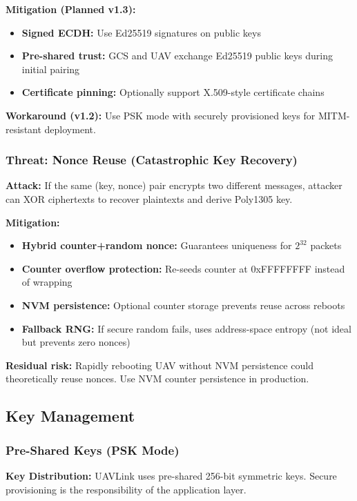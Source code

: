 \documentclass[11pt,a4paper]{article}
\begin{document}
\textbf{Mitigation (Planned v1.3):}
\begin{itemize}[noitemsep]
    \item \textbf{Signed ECDH:} Use Ed25519 signatures on public keys
    \item \textbf{Pre-shared trust:} GCS and UAV exchange Ed25519 public keys during initial pairing
    \item \textbf{Certificate pinning:} Optionally support X.509-style certificate chains
\end{itemize}

\textbf{Workaround (v1.2):} Use PSK mode with securely provisioned keys for MITM-resistant deployment.

\subsubsection{Threat: Nonce Reuse (Catastrophic Key Recovery)}

\textbf{Attack:} If the same (key, nonce) pair encrypts two different messages, attacker can XOR ciphertexts to recover plaintexts and derive Poly1305 key.

\textbf{Mitigation:}
\begin{itemize}[noitemsep]
    \item \textbf{Hybrid counter+random nonce:} Guarantees uniqueness for $2^{32}$ packets
    \item \textbf{Counter overflow protection:} Re-seeds counter at 0xFFFFFFFF instead of wrapping
    \item \textbf{NVM persistence:} Optional counter storage prevents reuse across reboots
    \item \textbf{Fallback RNG:} If secure random fails, uses address-space entropy (not ideal but prevents zero nonces)
\end{itemize}

\textbf{Residual risk:} Rapidly rebooting UAV without NVM persistence could theoretically reuse nonces. Use NVM counter persistence in production.

\subsection{Key Management}

\subsubsection{Pre-Shared Keys (PSK Mode)}

\textbf{Key Distribution:} UAVLink uses pre-shared 256-bit symmetric keys. Secure provisioning is the responsibility of the application layer.
\end{document}
